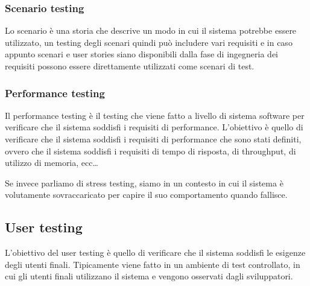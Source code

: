\subsubsection{Scenario testing}
Lo scenario è una storia che descrive un modo in cui il sistema potrebbe
essere utilizzato, un testing degli scenari quindi può includere vari requisiti
e in caso appunto scenari e user stories siano disponibili dalla fase di ingegneria
dei requisiti possono essere direttamente utilizzati come scenari di test.

\subsubsection{Performance testing}
Il performance testing è il testing che viene fatto a livello di sistema software
per verificare che il sistema soddisfi i requisiti di performance.
L'obiettivo è quello di verificare che il sistema soddisfi i requisiti di performance
che sono stati definiti, ovvero che il sistema soddisfi i requisiti di tempo di
risposta, di throughput, di utilizzo di memoria, ecc\dots

Se invece parliamo di stress testing, siamo in un contesto in cui il sistema è
volutamente sovraccaricato per capire il suo comportamento quando fallisce.

\subsection{User testing}
L'obiettivo del user testing è quello di verificare che il sistema soddisfi le
esigenze degli utenti finali. Tipicamente viene fatto in un ambiente di test
controllato, in cui gli utenti finali utilizzano il sistema e vengono osservati
dagli sviluppatori.

